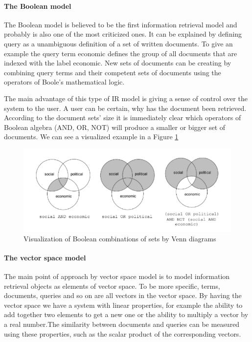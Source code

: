 \documentclass[10pt ,english,a4paper]{article}
\begin{document}
\paragraph{The Boolean model} 

The Boolean model is believed to be the first information retrieval model and probably is also one of the most criticized ones. It can be explained by defining query as a unambiguous definition of a set of written documents. To give an example the query term economic defines the group of all documents that are indexed with the label economic. New sets of documents can be creating by combining query terms and their competent sets of documents using the operators of Boole's mathematical logic.

The main advantage of this type of IR model is giving a sense of control over the system to the user. A user can be certain, why has the document been retrieved. According to the document sets' size it is immediately clear which operators of Boolean algebra (AND, OR, NOT) will produce a smaller or bigger set of documents. We can see a visualized example in a Figure \ref{f:boole}\cite{hiem09info}

\begin{figure}[tbh]
\centering
\includegraphics[scale=1.0]{figure2.pdf}
\caption{Visualization of Boolean combinations of sets by Venn diagrams}
\label{f:boole}
\end{figure}

\paragraph{The vector space model}
The main point of approach by vector space model is to model information retrieval objects as elements of vector space. To be more specific, terms, documents, queries and so on are all vectors in the vector space. By having the vector space we have a system with linear properties, for example the ability to add together two elements to get a new one or the ability to multiply a vector by a real number.The similarity between documents and queries can be measured using these properties, such as the scalar product of the corresponding vectors. 
\end{document}
